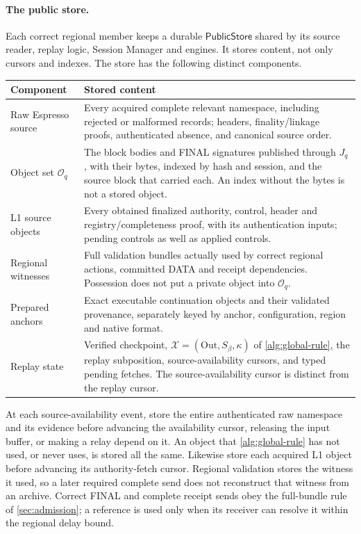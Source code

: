 \documentclass[11pt,a4paper]{article}
\newcommand{\tagg}[1]{\ensuremath{\mathsf{#1}}}
\begin{document}
\paragraph{The public store.}
Each correct regional member keeps a durable \tagg{PublicStore} shared
by its source reader, replay logic, Session Manager and engines. It stores content, not only cursors and indexes. The store
has the following distinct components.
\begin{table}[htbp]\centering\small
\begin{tabularx}{\linewidth}{@{}>{\raggedright\arraybackslash}p{.24\linewidth}Y@{}}\toprule
Component & Stored content\\\midrule
Raw Espresso source & Every acquired complete relevant namespace,
including rejected or malformed records; headers, finality/linkage
proofs, authenticated absence, and canonical source order.\\
Object set $\mathcal O_q$ & The block bodies and FINAL signatures
published through $J_q$, with their bytes, indexed by hash and session,
and the source block that carried each. An index without the bytes is
not a stored object.\\
L1 source objects & Every obtained finalized authority, control,
header and registry/completeness proof, with its authentication inputs;
pending controls as well as applied controls.\\
Regional witnesses & Full validation bundles actually used by correct
regional actions, committed DATA and receipt dependencies. Possession
does not put a private object into $\mathcal O_q$.\\
Prepared anchors & Exact executable continuation objects and their
validated provenance, separately keyed by anchor, configuration,
region and native format.\\
Replay state & Verified checkpoint,
$\mathcal X=(\mathrm{Out},S_\beta,\kappa)$ of \cref{alg:global-rule}, the replay subposition,
source-availability cursors, and typed pending fetches.
The source-availability cursor is distinct from the replay cursor.\\\bottomrule
\end{tabularx}
\end{table}

At each source-availability event, store the entire authenticated raw
namespace and its evidence before advancing the availability cursor,
releasing the input buffer, or making a relay depend on it. An object
that \cref{alg:global-rule} has not used, or never uses, is stored all
the same. Likewise store each acquired L1
object before advancing its authority-fetch cursor. Regional validation
stores the witness it used, so a later required complete send does not
reconstruct that witness from an archive. Correct FINAL and complete
receipt sends obey the full-bundle rule of \cref{sec:admission}; a
reference is used only when its receiver can resolve it within the
regional delay bound.
\end{document}
